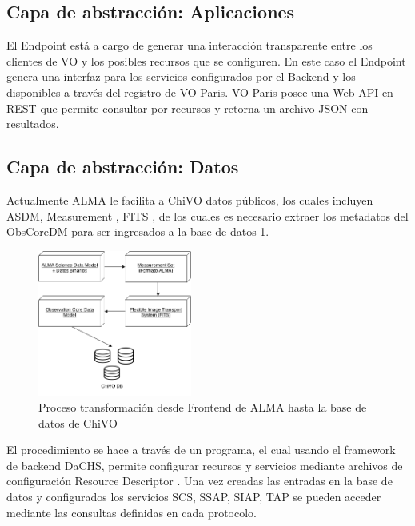 \subsection{Capa de abstracción: Aplicaciones}

El Endpoint está a cargo de generar una interacción transparente entre los clientes
de VO y los posibles recursos que se configuren.
En este caso el Endpoint genera una interfaz para los servicios configurados por el
Backend y los disponibles a través del registro de VO-Paris.
VO-Paris posee una Web API en REST que permite consultar por recursos y retorna un
archivo JSON con resultados.

\subsection{Capa de abstracción: Datos}

Actualmente ALMA le facilita a ChiVO datos públicos, los cuales incluyen ASDM,
Measurement \cite{petry2012analysing}, FITS \cite{wells1981fits}, de los cuales es
necesario extraer los metadatos del ObsCoreDM para ser ingresados a la base de 
datos \ref{fig:metadata}.

\begin{figure}[h!t]
    \centering
    \includegraphics[width=0.45\textwidth]{images/metadata.png}
    \caption{Proceso transformación desde Frontend de ALMA hasta la base de datos
             de ChiVO}
    \label{fig:metadata}
\end{figure}

El procedimiento se hace a través de un programa, el cual usando el framework de
backend DaCHS, permite configurar recursos y servicios mediante
archivos de configuración Resource Descriptor \cite{dachsorguide}.
Una vez creadas las entradas en la base de datos y configurados los servicios SCS,
SSAP, SIAP, TAP se pueden acceder mediante las consultas definidas en cada
protocolo.

